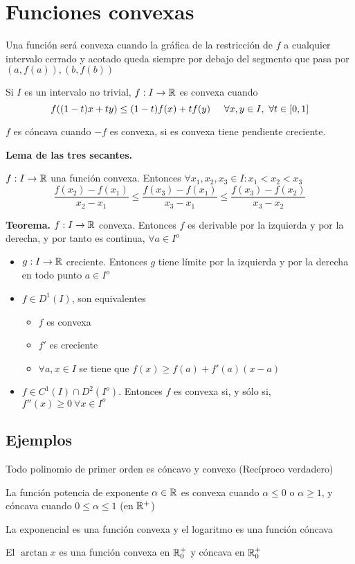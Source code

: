 \section{Funciones convexas}
Una función será convexa cuando la gráfica de la restricción de $f$ a cualquier intervalo cerrado y acotado queda siempre por debajo del segmento que pasa por $(a,f(a)), (b,f(b))$

Si $I$ es un intervalo no trivial, $f:I\rightarrow\mathbb{R}$ es convexa cuando
$$ f((1-t)x+ty) \leq (1-t)f(x) + tf(y)\hspace{0.5cm}
\forall x,y\in I,\ \forall t\in[0,1] $$

$f$ es cóncava cuando $-f$ es convexa, si es convexa tiene pendiente creciente.

\textbf{Lema de las tres secantes.}

$f:I\rightarrow\mathbb{R}$ una función convexa. Entonces $\forall x_1,x_2,x_3\in I : x_1<x_2<x_3$
$$ \frac{f(x_2)-f(x_1)}{x_2-x_1} \leq 
   \frac{f(x_3)-f(x_1)}{x_3-x_1} \leq 
   \frac{f(x_3)-f(x_2)}{x_3-x_2}$$
   
\textbf{Teorema.}
$f:I\rightarrow\mathbb{R}$ convexa. Entonces $f$ es derivable por la izquierda y por la derecha, y por tanto es continua, $\forall a\in I^o$

\begin{itemize}
	\item $g:I\rightarrow\mathbb{R}$ creciente. Entonces $g$ tiene límite por la izquierda y por la derecha en todo punto $a\in I^o$
	\item $f\in D^1(I)$, son equivalentes
	\begin{itemize}
		\item $f$ es convexa
		\item $f'$ es creciente
		\item $\forall a,x\in I$ se tiene que $f(x)\geq f(a)+f'(a)(x-a)$
	\end{itemize}
\end{itemize}

\begin{itemize}
	\item $f\in C^1(I)\cap D^2(I^o)$. Entonces $f$ es convexa si, y sólo si, $f''(x)\geq 0 \ \forall x\in I^o$
\end{itemize}
\subsection{Ejemplos}
Todo polinomio de primer orden es cóncavo y convexo  (Recíproco verdadero)

La función potencia de exponente $\alpha\in\mathbb{R}$ es convexa cuando $\alpha\leq 0$ o $\alpha\geq1$, y cóncava cuando $0\leq\alpha\leq1$ (en $\mathbb{R}^+$)

La exponencial es una función convexa y el logaritmo es una función cóncava

El $\arctan x$ es una función convexa en $\mathbb{R}^+_0$ y cóncava en $\mathbb{R}^+_0$

